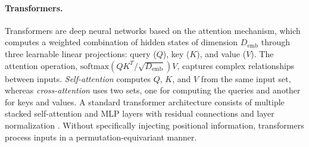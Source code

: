 \documentclass[twoside]{article}
\begin{document}
\vspace{-0.25em}
\paragraph{Transformers.}
Transformers \citep{vaswani2017attention} are deep neural networks based on the attention mechanism, which computes a weighted combination of hidden states of dimension $D_\text{emb}$ through three learnable linear projections: query ($Q$), key ($K$), and value ($V$). The attention operation, $\text{softmax}(QK^T / \sqrt{D_\text{emb}})V$, captures complex relationships between inputs. \emph{Self-attention} computes $Q$, $K$, and $V$ from the same input set, whereas \emph{cross-attention} uses two sets, one for computing the queries and another for keys and values.
A standard transformer architecture consists of multiple stacked self-attention and MLP layers with residual connections and layer normalization \citep{vaswani2017attention}. Without specifically injecting positional information, transformers process inputs in a permutation-equivariant manner. 

\vspace{-0.25em}
\end{document}
